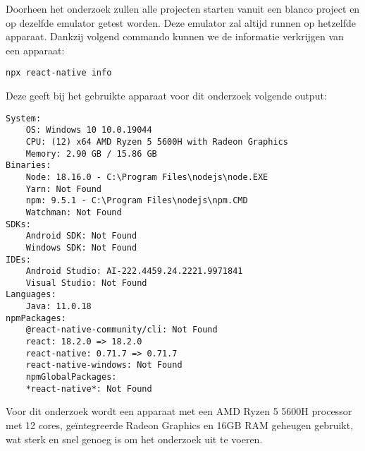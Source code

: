 Doorheen het onderzoek zullen alle projecten starten vanuit een blanco project en op dezelfde emulator 
getest worden. Deze emulator zal altijd runnen op hetzelfde apparaat. Dankzij volgend commando 
kunnen we de informatie verkrijgen van een apparaat:
\begin{verbatim}
npx react-native info
\end{verbatim}
Deze geeft bij het gebruikte apparaat voor dit onderzoek volgende output:
\begin{verbatim}
System:
    OS: Windows 10 10.0.19044
    CPU: (12) x64 AMD Ryzen 5 5600H with Radeon Graphics
    Memory: 2.90 GB / 15.86 GB
Binaries:
    Node: 18.16.0 - C:\Program Files\nodejs\node.EXE
    Yarn: Not Found
    npm: 9.5.1 - C:\Program Files\nodejs\npm.CMD
    Watchman: Not Found
SDKs:
    Android SDK: Not Found
    Windows SDK: Not Found
IDEs:
    Android Studio: AI-222.4459.24.2221.9971841
    Visual Studio: Not Found
Languages:
    Java: 11.0.18
npmPackages:
    @react-native-community/cli: Not Found
    react: 18.2.0 => 18.2.0 
    react-native: 0.71.7 => 0.71.7 
    react-native-windows: Not Found
    npmGlobalPackages:
    *react-native*: Not Found
\end{verbatim}
Voor dit onderzoek wordt een apparaat met een AMD Ryzen 5 5600H processor 
met 12 cores, geïntegreerde Radeon Graphics en 16GB RAM geheugen gebruikt, wat sterk en snel 
genoeg is om het onderzoek uit te voeren.